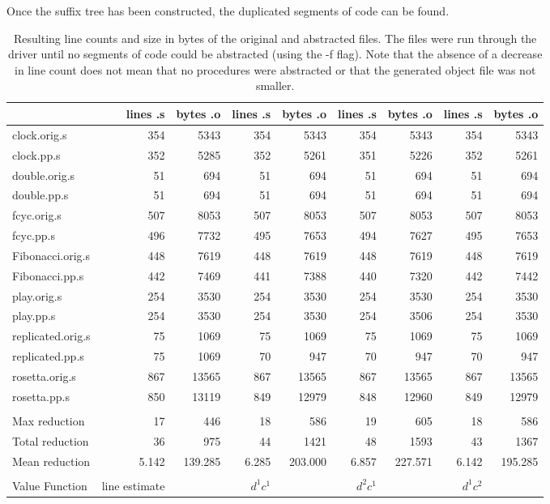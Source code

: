 \documentclass[9pt,nocopyrightspace]{sigplanconf}
\begin{document}
Once the suffix tree has been constructed, the duplicated segments of code can be found.

\begin{table}
\begin{center}
\begin{tabular}{|l|r|r|r|r|r|r|r|r|} \hline
&lines .s&bytes .o&lines .s&bytes .o&lines .s&bytes .o&lines .s&bytes .o\\ \hline
clock.orig.s&354&5343&354&5343&354&5343&354&5343\\ \hline
clock.pp.s&352&5285&352&5261&351&5226&352&5261\\ \hline
double.orig.s&51&694&51&694&51&694&51&694\\ \hline
double.pp.s&51&694&51&694&51&694&51&694\\ \hline
fcyc.orig.s&507&8053&507&8053&507&8053&507&8053\\ \hline
fcyc.pp.s&496&7732&495&7653&494&7627&495&7653\\ \hline
Fibonacci.orig.s&448&7619&448&7619&448&7619&448&7619\\ \hline
Fibonacci.pp.s&442&7469&441&7388&440&7320&442&7442\\ \hline
play.orig.s&254&3530&254&3530&254&3530&254&3530\\ \hline
play.pp.s&254&3530&254&3530&254&3506&254&3530\\ \hline
replicated.orig.s&75&1069&75&1069&75&1069&75&1069\\ \hline
replicated.pp.s&75&1069&70&947&70&947&70&947\\ \hline
rosetta.orig.s&867&13565&867&13565&867&13565&867&13565\\ \hline
rosetta.pp.s&850&13119&849&12979&848&12960&849&12979\\ \hline
&&&&&&&&\\ \hline
Max reduction&17&446&18&586&19&605&18&586\\ \hline
Total reduction&36&975&44&1421&48&1593&43&1367\\ \hline
Mean reduction&5.142&139.285&6.285&203.000&6.857&227.571&6.142&195.285\\ \hline
&&&&&&&&\\ \hline
Value Function&line estimate&&$d^{1} c^{1}$&&$d^{2} c^{1}$&&$d^{1} c^{2}$&\\ \hline
\end{tabular}
\caption{Resulting line counts and size in bytes of the original and abstracted files. The files were run through the driver until no segments of code could be abstracted (using the -f flag). Note that the absence of a decrease in line count does not mean that no procedures were abstracted or that the generated object file was not smaller.}
\end{center}
\end{table}
\end{document}
